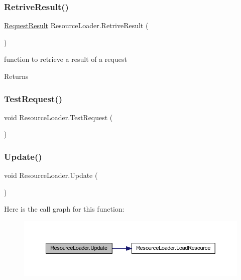 \subsubsection{\texorpdfstring{Retrive\+Result()}{RetriveResult()}}
{\footnotesize\ttfamily \mbox{\hyperlink{struct_resource_loader_1_1_request_result}{Request\+Result}} Resource\+Loader.\+Retrive\+Result (\begin{DoxyParamCaption}{ }\end{DoxyParamCaption})}



function to retrieve a result of a request 

\begin{DoxyReturn}{Returns}

\end{DoxyReturn}
\mbox{\label{class_resource_loader_a39eb6b54c79c44d103b0aedfcdc69f81}} 
\subsubsection{\texorpdfstring{Test\+Request()}{TestRequest()}}
{\footnotesize\ttfamily void Resource\+Loader.\+Test\+Request (\begin{DoxyParamCaption}{ }\end{DoxyParamCaption})\hspace{0.3cm}{\ttfamily [private]}}

\mbox{\label{class_resource_loader_a20a1036648a453863c96b51d33edfa11}} 
\subsubsection{\texorpdfstring{Update()}{Update()}}
{\footnotesize\ttfamily void Resource\+Loader.\+Update (\begin{DoxyParamCaption}{ }\end{DoxyParamCaption})\hspace{0.3cm}{\ttfamily [private]}}

Here is the call graph for this function\+:
\nopagebreak
\begin{figure}[H]
\begin{center}
\leavevmode
\includegraphics[width=350pt]{class_resource_loader_a20a1036648a453863c96b51d33edfa11_cgraph}
\end{center}
\end{figure}


